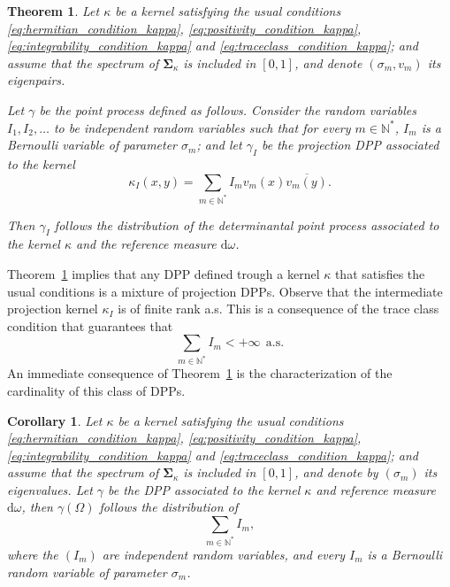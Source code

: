 \documentclass[twoside,11pt]{book}
\newtheorem{corollary}{Corollary}
\newtheorem{theorem}{Theorem}
\numberwithin{theorem}{chapter}
\numberwithin{definition}{chapter}
\numberwithin{proposition}{chapter}
\numberwithin{corollary}{chapter}
\numberwithin{example}{chapter}
\numberwithin{lemma}{chapter}
\begin{document}
\begin{theorem}\label{thm:mixture_of_projection_DPPs}
Let $\kappa$ be a kernel satisfying the usual conditions \eqref{eq:hermitian_condition_kappa}, \eqref{eq:positivity_condition_kappa}, \eqref{eq:integrability_condition_kappa} and \eqref{eq:traceclass_condition_kappa}; and assume that the spectrum of $\bm{\Sigma}_{\kappa}$ is included in $[0,1]$, and denote $(\sigma_{m},v_{m})$ its eigenpairs.


Let $\gamma$ be the point process defined as follows. Consider the random variables $I_{1},I_{2}, \dots $ to be independent random variables such that for every $m \in \mathbb{N}^{*}$, $I_{m}$ is a Bernoulli variable of parameter $\sigma_m$; and let $\gamma_{I}$ be the projection DPP associated to the kernel
\begin{equation}
\kappa_{I}(x,y) = \sum\limits_{m \in \mathbb{N}^{*}} I_{m} v_{m}(x)\overline{v_{m}(y)}.
\end{equation}

Then $\gamma_{I}$ follows the distribution of the determinantal point process associated to the kernel $\kappa$ and the reference measure $\mathrm{d}\omega$.
\end{theorem}
Theorem~\ref{thm:mixture_of_projection_DPPs} implies that any DPP defined trough a kernel $\kappa$ that satisfies the usual conditions is a mixture of projection DPPs.
Observe that the intermediate projection kernel $\kappa_{I}$ is of finite rank a.s. This is a consequence of the trace class condition that guarantees that 
\begin{equation}
\sum\limits_{m \in \mathbb{N}^{*}} I_{m} <+\infty \:\: \text{a.s.}
\end{equation}
An immediate consequence of Theorem~\ref{thm:mixture_of_projection_DPPs} is the characterization of the cardinality of this class of DPPs.
\begin{corollary}
Let $\kappa$ be a kernel satisfying the usual conditions \eqref{eq:hermitian_condition_kappa}, \eqref{eq:positivity_condition_kappa}, \eqref{eq:integrability_condition_kappa} and \eqref{eq:traceclass_condition_kappa}; and assume that the spectrum of $\bm{\Sigma}_{\kappa}$ is included in $[0,1]$, and denote by $(\sigma_{m})$ its eigenvalues. Let $\gamma$ be the DPP associated to the kernel $\kappa$ and reference measure $\mathrm{d}\omega$, then $\gamma(\Omega)$ follows the distribution of 
\begin{equation}
\sum\limits_{m \in \mathbb{N}^{*}} I_{m},
\end{equation}
where the $(I_m)$ are independent random variables, and every $I_m$ is a Bernoulli random variable of parameter $\sigma_m$.
\end{corollary}
\end{document}
